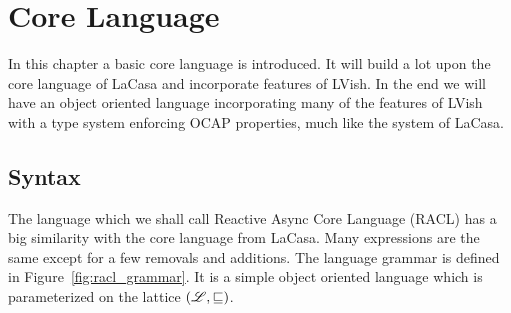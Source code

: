\chapter{Core Language}%
\label{cha:core_language}

In this chapter a basic core language is introduced. It will build a lot upon
the core language of LaCasa and incorporate features of LVish. In the end we will
have an object oriented language incorporating many of the features of LVish with
a type system enforcing OCAP properties, much like the system of LaCasa.

\section{Syntax}
\label{sec:syntax}

The language which we shall call Reactive Async Core Language (RACL) has a big
similarity with the core language from LaCasa. Many expressions are the same
except for a few removals and additions. The language grammar is defined in
Figure~\ref{fig:racl_grammar}. It is a simple object oriented language which is
parameterized on the lattice $(\mbox{$\mathscr{L}$}, \sqsubseteq)$.


